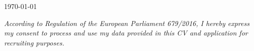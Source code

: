 \documentclass[10.5pt,a4paper,final,roman]{moderncv}
\begin{document}
\vspace{2mm}




\vspace{1.5cm}
\today		

\emptysection{}\closesection
\vfill
\begin{center}

	\textit{\small According to Regulation of the European Parliament
		679/2016, I hereby express my consent to process and use my data provided in
		this CV and application for recruiting purposes.}
\end{center}
\end{document}
